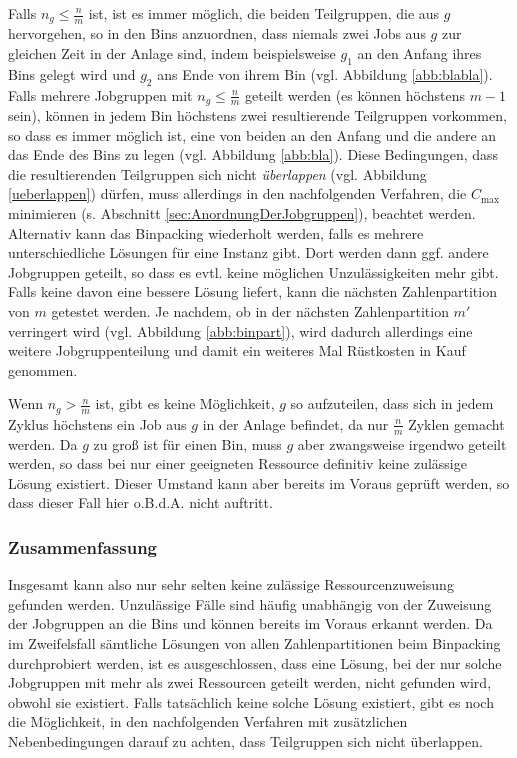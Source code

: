 \documentclass{scrreprt}
\begin{document}
Falls $n_g \leq \frac{n}{m}$ ist, ist es immer möglich, die beiden Teilgruppen, die aus $g$ hervorgehen,
so in den Bins anzuordnen, dass niemals zwei Jobs aus $g$ zur gleichen Zeit in der Anlage sind, indem beispielsweise
$g_1$ an den Anfang ihres Bins gelegt wird und $g_2$ ans Ende von ihrem Bin (vgl. Abbildung \ref{abb:blabla}).
Falls mehrere Jobgruppen mit $n_g \leq \frac{n}{m}$ geteilt werden (es können höchstens $m-1$ sein), können in jedem Bin höchstens zwei resultierende 
Teilgruppen vorkommen, so dass es immer möglich ist, eine von beiden an den Anfang und die andere an das Ende des Bins zu legen (vgl. Abbildung \ref{abb:bla}).
Diese Bedingungen, dass die resultierenden Teilgruppen sich nicht \textit{überlappen} (vgl. Abbildung \ref{ueberlappen}) dürfen, 
muss allerdings in den nachfolgenden Verfahren, die $C_{\max}$ minimieren (s. Abschnitt \ref{sec:AnordnungDerJobgruppen}), beachtet werden.
Alternativ kann das Binpacking wiederholt werden, falls es mehrere unterschiedliche Lösungen für eine Instanz gibt. 
Dort werden dann ggf. andere Jobgruppen geteilt, so dass es evtl. keine möglichen Unzulässigkeiten mehr gibt.
Falls keine davon eine bessere Lösung liefert, kann die nächsten Zahlenpartition von $m$ getestet werden.
Je nachdem, ob in der nächsten Zahlenpartition $m'$ verringert wird (vgl. Abbildung \ref{abb:binpart}),
wird dadurch allerdings eine weitere Jobgruppenteilung und damit ein weiteres Mal Rüstkosten in Kauf genommen.

Wenn $n_g > \frac{n}{m}$ ist,
gibt es keine Möglichkeit, $g$ so aufzuteilen, 
dass sich in jedem Zyklus höchstens ein Job aus $g$ in der Anlage befindet,
da nur $\frac{n}{m}$ Zyklen gemacht werden. 
Da $g$ zu groß ist für einen Bin, muss $g$ aber zwangsweise irgendwo geteilt werden, so dass bei nur einer geeigneten Ressource definitiv keine zulässige Lösung existiert.
Dieser Umstand kann aber bereits im Voraus geprüft werden, so dass dieser Fall hier o.B.d.A. nicht auftritt.

\subsubsection{Zusammenfassung}
Insgesamt kann also nur sehr selten keine zulässige Ressourcenzuweisung gefunden werden.
Unzulässige Fälle sind häufig unabhängig von der Zuweisung der Jobgruppen an die Bins und können bereits im Voraus erkannt werden.
Da im Zweifelsfall sämtliche Lösungen von allen Zahlenpartitionen beim Binpacking durchprobiert werden, ist es ausgeschlossen, dass eine Lösung,
bei der nur solche Jobgruppen mit mehr als zwei Ressourcen geteilt werden, nicht gefunden wird, obwohl sie existiert.
Falls tatsächlich keine solche Lösung existiert, gibt es noch die Möglichkeit, in den nachfolgenden Verfahren mit zusätzlichen Nebenbedingungen darauf zu achten,
dass Teilgruppen sich nicht überlappen.
\end{document}
